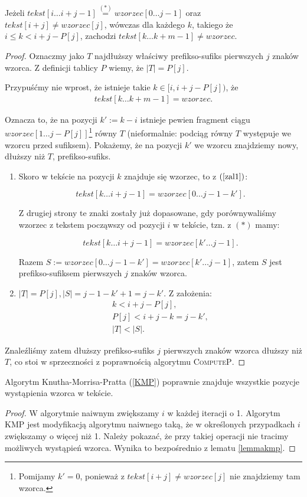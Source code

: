 \begin{lemma}
	\label{lemmakmp}
	Jeżeli $tekst[i\dots i+j-1] \mathrel{\overset{(\ast)}{=}} wzorzec[0 \dots j-1]$ oraz $tekst[i + j] \neq wzorzec[j]$, wówczas dla każdego $k$, takiego że $i \leq k < i + j - P[j]$, zachodzi $tekst[k \dots k + m - 1] \neq wzorzec$.
	\begin{proof}
		Oznaczmy jako $T$ najdłuższy właściwy prefikso-sufiks pierwszych $j$ znaków wzorca. Z definicji tablicy $P$ wiemy, że $|T|=P[j]$.
		
		Przypuśćmy nie wprost, że istnieje takie $k \in [i, i + j - P[j])$, że 
		\begin{gather}
			\label{zal1}
			tekst[k\dots k+m-1] = wzorzec.				
		\end{gather}

		Oznacza to, że na pozycji $k' := k - i$ istnieje pewien fragment ciągu $wzorzec[{1 \dots j - P[j]}]$\footnote{Pomijamy $k'=0$, ponieważ z $tekst[i+j] \neq wzorzec[j]$ nie znajdziemy tam wzorca.} równy $T$ (nieformalnie: podciąg równy $T$ występuje we wzorcu przed sufiksem).
		Pokażemy, że na pozycji $k'$ we wzorcu znajdziemy nowy, dłuższy niż $T$, prefikso-sufiks. 
		
		\begin{enumerate}
			\item Skoro w tekście na pozycji $k$ znajduje się wzorzec, to z $(\ref{zal1})$:
			 
			 $$tekst[k\dots i+j-1]=wzorzec[0\dots j-1-k'].$$ 
			 
			 Z drugiej strony te znaki zostały już dopasowane, gdy porównywaliśmy wzorzec z tekstem począwszy od pozycji $i$ w tekście, tzn. z $(\ast)$ mamy:
			 
			 $$tekst[k\dots i+j-1] = wzorzec[k' \dots j-1].$$
			 
			 Razem $S:=wzorzec[0\dots j-1-k']=wzorzec[k' \dots j-1]$, zatem $S$ jest prefikso-sufiksem pierwszych $j$ znaków wzorca.
			\item $|T|=P[j], |S| = j-1-k'+1=j-k'$. Z założenia: 
			\begin{gather*}
				k < i + j - P[j], \\
				P[j] < i + j - k = j - k', \\
				|T|<|S|.
			\end{gather*}
		\end{enumerate}
	
		Znaleźliśmy zatem dłuższy prefikso-sufiks $j$ pierwszych znaków wzorca dłuższy niż $T$, co stoi w sprzeczności z poprawnością algorytmu \textsc{ComputeP}. 
	\end{proof}
\end{lemma}

\begin{theorem}
	Algorytm Knutha-Morrisa-Pratta (\ref{KMP}) poprawnie znajduje wszystkie pozycje wystąpienia wzorca w tekście. 
	\begin{proof}
		W algorytmie naiwnym zwiększamy $i$ w każdej iteracji o 1. Algorytm KMP jest modyfikacją algorytmu naiwnego taką, że w określonych przypadkach $i$ zwiększamy o więcej niż 1. Należy pokazać, że przy takiej operacji nie tracimy możliwych wystąpień wzorca. Wynika to bezpośrednio z lematu \ref{lemmakmp}.
	\end{proof}
\end{theorem}